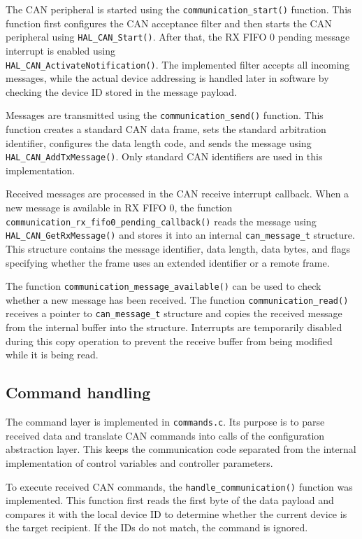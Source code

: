 The CAN peripheral is started using the \texttt{communication\_start()} function.
This function first configures the CAN acceptance filter and then starts the CAN peripheral using \texttt{HAL\_CAN\_Start()}.
After that, the RX FIFO 0 pending message interrupt is enabled using\\ \texttt{HAL\_CAN\_ActivateNotification()}.
The implemented filter accepts all incoming messages, while the actual device addressing is handled later in software by checking the device ID stored in the message payload.

Messages are transmitted using the \texttt{communication\_send()} function.
This function creates a standard CAN data frame, sets the standard arbitration identifier, configures the data length code, and sends the message using \texttt{HAL\_CAN\_AddTxMessage()}.
Only standard CAN identifiers are used in this implementation.

Received messages are processed in the CAN receive interrupt callback.
When a new message is available in RX FIFO 0, the function \texttt{communication\_rx\_fifo0\_pending\_callback()} reads the message using \texttt{HAL\_CAN\_GetRxMessage()} 
and stores it into an internal \texttt{can\_message\_t} structure.
This structure contains the message identifier, data length, data bytes, and flags specifying whether the frame uses an extended identifier or a remote frame.

The function \texttt{communication\_message\_available()} can be used to check whether a new message has been received.
The function \texttt{communication\_read()} receives a pointer to \texttt{can\_message\_t} structure and copies the received message from the internal buffer into the structure.
Interrupts are temporarily disabled during this copy operation to prevent the receive buffer from being modified while it is being read.

\subsection{Command handling}

The command layer is implemented in \texttt{commands.c}.
Its purpose is to parse received data and translate CAN commands into calls of the configuration abstraction layer.
This keeps the communication code separated from the internal implementation of control variables and controller parameters.

To execute received CAN commands, the \texttt{handle\_communication()} function was implemented.
This function first reads the first byte of the data payload and compares it with the local device ID to determine whether the current device is the target recipient.
If the IDs do not match, the command is ignored.

